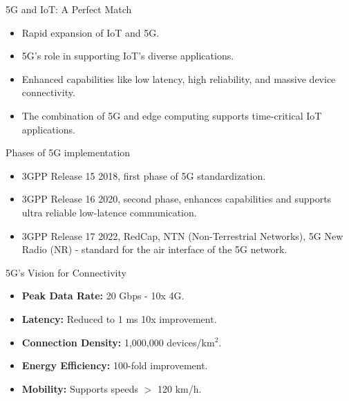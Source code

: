 \documentclass{beamer}
\begin{document}
\begin{frame}{5G and IoT: A Perfect Match}
  \begin{itemize}
      \item Rapid expansion of IoT and 5G.
      \vspace*{0.7em}
      \item 5G's role in supporting IoT's diverse applications.
      \vspace*{0.7em}
      \item Enhanced capabilities like low latency, high reliability, and massive device connectivity.
      \vspace*{0.7em}
      \item The combination of 5G and edge computing supports time-critical IoT applications.
  \end{itemize}
\end{frame}

\begin{frame}{Phases of 5G implementation}
  \begin{itemize}
      \item 3GPP Release 15 2018, first phase of 5G standardization.
      \vspace*{0.5em}
      \item 3GPP Release 16 2020, second phase, enhances capabilities and supports ultra reliable low-latence communication.
      \vspace*{0.5em}
      \item 3GPP Release 17 2022, RedCap, NTN (Non-Terrestrial Networks), 5G New Radio (NR) - standard for the air interface of the 5G network. 
  \end{itemize}
\end{frame}

\begin{frame}{5G's Vision for Connectivity}
  \begin{itemize}
      \item \textbf{Peak Data Rate:} 20 Gbps - 10x 4G.
      \vspace*{0.4em}
      \item \textbf{Latency:} Reduced to 1 ms 10x improvement.
      \vspace*{0.4em}
      \item \textbf{Connection Density:} 1,000,000 devices/km$^2$.
      \vspace*{0.4em}
      \item \textbf{Energy Efficiency:} 100-fold improvement.
      \vspace*{0.4em}
      \item \textbf{Mobility:} Supports speeds $>$ 120 km/h.
  \end{itemize}
\end{frame}
\end{document}
